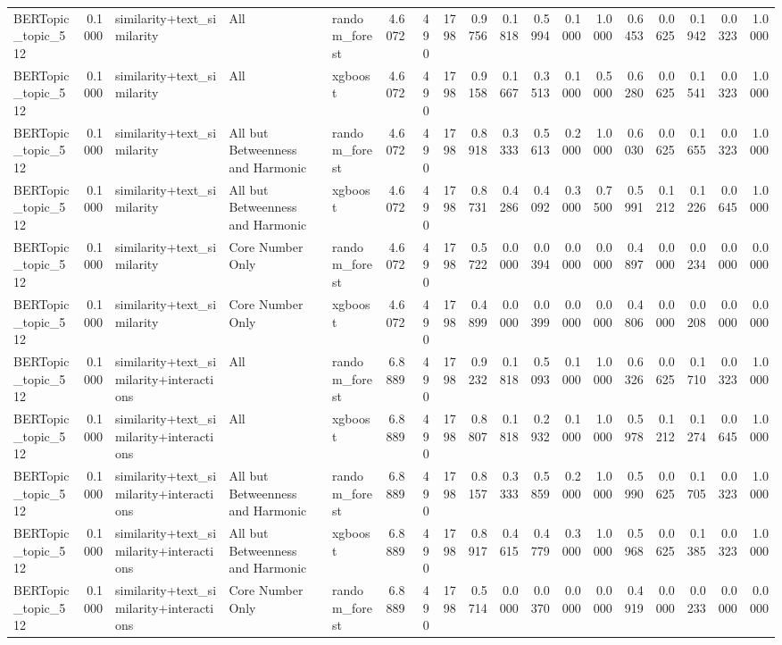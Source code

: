 \begin{tabular}{lrlllrrrrrrrrrrrrr}
BERTopic_topic_512 & 0.1000 & similarity+text_similarity & All & random_forest & 4.6072 & 490 & 1798 & 0.9756 & 0.1818 & 0.5994 & 0.1000 & 1.0000 & 0.6453 & 0.0625 & 0.1942 & 0.0323 & 1.0000 \\
BERTopic_topic_512 & 0.1000 & similarity+text_similarity & All & xgboost & 4.6072 & 490 & 1798 & 0.9158 & 0.1667 & 0.3513 & 0.1000 & 0.5000 & 0.6280 & 0.0625 & 0.1541 & 0.0323 & 1.0000 \\
BERTopic_topic_512 & 0.1000 & similarity+text_similarity & All but Betweenness and Harmonic & random_forest & 4.6072 & 490 & 1798 & 0.8918 & 0.3333 & 0.5613 & 0.2000 & 1.0000 & 0.6030 & 0.0625 & 0.1655 & 0.0323 & 1.0000 \\
BERTopic_topic_512 & 0.1000 & similarity+text_similarity & All but Betweenness and Harmonic & xgboost & 4.6072 & 490 & 1798 & 0.8731 & 0.4286 & 0.4092 & 0.3000 & 0.7500 & 0.5991 & 0.1212 & 0.1226 & 0.0645 & 1.0000 \\
BERTopic_topic_512 & 0.1000 & similarity+text_similarity & Core Number Only & random_forest & 4.6072 & 490 & 1798 & 0.5722 & 0.0000 & 0.0394 & 0.0000 & 0.0000 & 0.4897 & 0.0000 & 0.0234 & 0.0000 & 0.0000 \\
BERTopic_topic_512 & 0.1000 & similarity+text_similarity & Core Number Only & xgboost & 4.6072 & 490 & 1798 & 0.4899 & 0.0000 & 0.0399 & 0.0000 & 0.0000 & 0.4806 & 0.0000 & 0.0208 & 0.0000 & 0.0000 \\
BERTopic_topic_512 & 0.1000 & similarity+text_similarity+interactions & All & random_forest & 6.8889 & 490 & 1798 & 0.9232 & 0.1818 & 0.5093 & 0.1000 & 1.0000 & 0.6326 & 0.0625 & 0.1710 & 0.0323 & 1.0000 \\
BERTopic_topic_512 & 0.1000 & similarity+text_similarity+interactions & All & xgboost & 6.8889 & 490 & 1798 & 0.8807 & 0.1818 & 0.2932 & 0.1000 & 1.0000 & 0.5978 & 0.1212 & 0.1274 & 0.0645 & 1.0000 \\
BERTopic_topic_512 & 0.1000 & similarity+text_similarity+interactions & All but Betweenness and Harmonic & random_forest & 6.8889 & 490 & 1798 & 0.8157 & 0.3333 & 0.5859 & 0.2000 & 1.0000 & 0.5990 & 0.0625 & 0.1705 & 0.0323 & 1.0000 \\
BERTopic_topic_512 & 0.1000 & similarity+text_similarity+interactions & All but Betweenness and Harmonic & xgboost & 6.8889 & 490 & 1798 & 0.8917 & 0.4615 & 0.4779 & 0.3000 & 1.0000 & 0.5968 & 0.0625 & 0.1385 & 0.0323 & 1.0000 \\
BERTopic_topic_512 & 0.1000 & similarity+text_similarity+interactions & Core Number Only & random_forest & 6.8889 & 490 & 1798 & 0.5714 & 0.0000 & 0.0370 & 0.0000 & 0.0000 & 0.4919 & 0.0000 & 0.0233 & 0.0000 & 0.0000 \\

\end{tabular}
